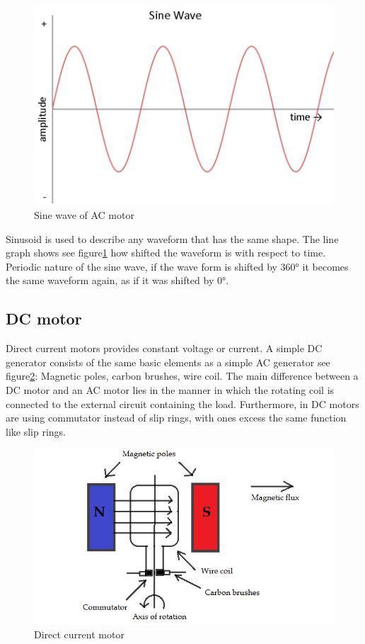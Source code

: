 \begin{figure}[h]
    \centering
    \includegraphics[width=.7\textwidth]{figures/wave.png}
    \caption{Sine wave of AC motor \cite{ACmotor3}} 
    \label{fig:ACmotor1} 
\end{figure}

Sinusoid is used to describe any waveform that has the same shape. The line graph shows see figure\ref{fig:ACmotor1} how shifted the waveform is with respect to time. Periodic nature of the sine wave, if the wave form is shifted by 360° it becomes the same waveform again, as if it was shifted by 0°. 

\subsection{DC motor}
 Direct current motors provides constant voltage or current. A simple DC generator consists of the same basic elements as a simple AC generator see figure\ref{fig:DCmotor}: Magnetic poles, carbon brushes, wire coil. The main difference between a DC motor and an AC motor lies in the manner in which the rotating coil is connected to the external circuit containing the load. Furthermore, in DC motors  are using commutator instead of slip rings, with ones excess the same function like slip rings. 
 
 \begin{figure}[h]
    \centering
    \includegraphics[width=.7\textwidth]{figures/Directcurrent(DC).png}
    \caption{Direct current motor } 
    \label{fig:DCmotor} 
\end{figure}

